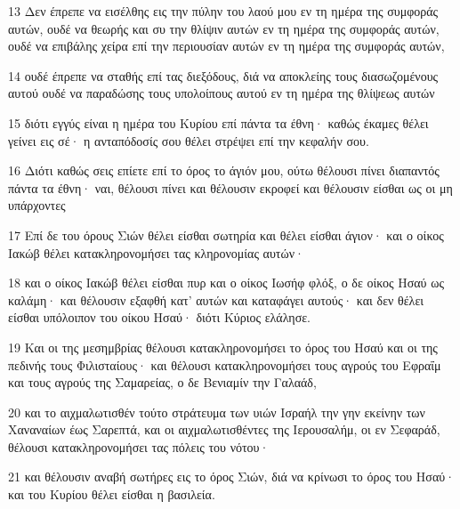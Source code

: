 \par 13 Δεν έπρεπε να εισέλθης εις την πύλην του λαού μου εν τη ημέρα της συμφοράς αυτών, ουδέ να θεωρής και συ την θλίψιν αυτών εν τη ημέρα της συμφοράς αυτών, ουδέ να επιβάλης χείρα επί την περιουσίαν αυτών εν τη ημέρα της συμφοράς αυτών,
\par 14 ουδέ έπρεπε να σταθής επί τας διεξόδους, διά να αποκλείης τους διασωζομένους αυτού ουδέ να παραδώσης τους υπολοίπους αυτού εν τη ημέρα της θλίψεως αυτών
\par 15 διότι εγγύς είναι η ημέρα του Κυρίου επί πάντα τα έθνη· καθώς έκαμες θέλει γείνει εις σέ· η ανταπόδοσίς σου θέλει στρέψει επί την κεφαλήν σου.
\par 16 Διότι καθώς σεις επίετε επί το όρος το άγιόν μου, ούτω θέλουσι πίνει διαπαντός πάντα τα έθνη· ναι, θέλουσι πίνει και θέλουσιν εκροφεί και θέλουσιν είσθαι ως οι μη υπάρχοντες
\par 17 Επί δε του όρους Σιών θέλει είσθαι σωτηρία και θέλει είσθαι άγιον· και ο οίκος Ιακώβ θέλει κατακληρονομήσει τας κληρονομίας αυτών·
\par 18 και ο οίκος Ιακώβ θέλει είσθαι πυρ και ο οίκος Ιωσήφ φλόξ, ο δε οίκος Ησαύ ως καλάμη· και θέλουσιν εξαφθή κατ' αυτών και καταφάγει αυτούς· και δεν θέλει είσθαι υπόλοιπον του οίκου Ησαύ· διότι Κύριος ελάλησε.
\par 19 Και οι της μεσημβρίας θέλουσι κατακληρονομήσει το όρος του Ησαύ και οι της πεδινής τους Φιλισταίους· και θέλουσι κατακληρονομήσει τους αγρούς του Εφραΐμ και τους αγρούς της Σαμαρείας, ο δε Βενιαμίν την Γαλαάδ,
\par 20 και το αιχμαλωτισθέν τούτο στράτευμα των υιών Ισραήλ την γην εκείνην των Χαναναίων έως Σαρεπτά, και οι αιχμαλωτισθέντες της Ιερουσαλήμ, οι εν Σεφαράδ, θέλουσι κατακληρονομήσει τας πόλεις του νότου·
\par 21 και θέλουσιν αναβή σωτήρες εις το όρος Σιών, διά να κρίνωσι το όρος του Ησαύ· και του Κυρίου θέλει είσθαι η βασιλεία.


